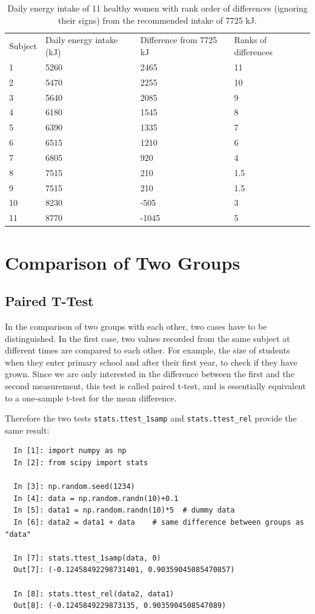 \begin{table}
  \centering
  \begin{tabular}{l p{2.5cm} p{2.5cm} p{2.5cm}}
     \hline
     Subject & Daily energy intake (kJ) & Difference from 7725 kJ & Ranks of differences \\
     1 & 5260 & 2465 & 11 \\
     2 & 5470 & 2255 & 10 \\
     3 & 5640 & 2085 & 9 \\
     4 & 6180 & 1545 & 8 \\
     5 & 6390 & 1335 & 7 \\
     6 & 6515 & 1210 & 6 \\
     7 & 6805 & 920 & 4 \\
     8 & 7515 & 210 & 1.5 \\
     9 & 7515 & 210 & 1.5 \\
     10 & 8230 & -505 & 3 \\
     11 & 8770 & -1045 & 5 \\
     \hline
   \end{tabular}
  \caption{Daily energy intake of 11 healthy women with rank order of differences (ignoring their signs) from the recommended intake of 7725 kJ.}\label{tab:wilcoxon}
\end{table}


\section{Comparison of Two Groups} 

\subsection{Paired T-Test}
In the comparison of two groups with each other, two cases have to be distinguished. In the first case, two values recorded from the same subject at different times are compared to each other. For example, the size of students when they enter primary school and after their first year, to check if they have grown. Since we are only interested in the difference between the first and the second measurement, this test is called \gls{paired} t-test, and is essentially equivalent to a one-sample t-test for the mean difference.

Therefore the two tests \lstinline{stats.ttest_1samp} and \lstinline{stats.ttest_rel} provide the same result:

\begin{lstlisting}
  In [1]: import numpy as np
  In [2]: from scipy import stats

  In [3]: np.random.seed(1234)
  In [4]: data = np.random.randn(10)+0.1
  In [5]: data1 = np.random.randn(10)*5  # dummy data
  In [6]: data2 = data1 + data    # same difference between groups as "data"

  In [7]: stats.ttest_1samp(data, 0)
  Out[7]: (-0.12458492298731401, 0.90359045085470857)

  In [8]: stats.ttest_rel(data2, data1)
  Out[8]: (-0.1245849229873135, 0.9035904508547089)
\end{lstlisting}

